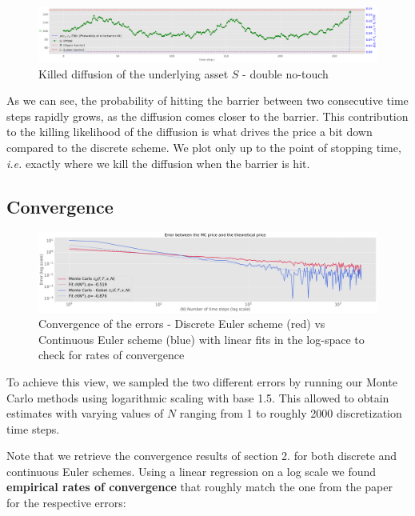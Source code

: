 \begin{figure}[H] 
    \centering
    \includegraphics[width=1\linewidth]{img/doublenotouch.png}
    \caption{Killed diffusion of the underlying asset $S$ - double no-touch}
    \label{fig:doublenotouch}
\end{figure}

As we can see, the probability of hitting the barrier between two consecutive time steps rapidly grows, as the diffusion comes closer to the barrier. This contribution to the killing likelihood of the diffusion is what drives the price a bit down compared to the discrete scheme. We plot only up to the point of stopping time, \textit{i.e.} exactly where we kill the diffusion when the barrier is hit.

\subsection{Convergence}

\begin{figure}[H]
    \centering
    \includegraphics[width=1\linewidth]{img/convergence.pdf}
    \caption{Convergence of the errors - Discrete Euler scheme (red) vs Continuous Euler scheme (blue) with linear fits in the log-space to check for rates of convergence}
    \label{fig:convergence}
\end{figure}

To achieve this view, we sampled the two different errors by running our Monte Carlo methods using logarithmic scaling with base 1.5. This allowed to obtain estimates with varying values of $N$ ranging from 1 to roughly 2000 discretization time steps.

Note that we retrieve the convergence results of section 2. for both discrete and continuous Euler schemes. Using a linear regression on a log scale we found \textbf{empirical rates of convergence} that roughly match the one from the paper for the respective errors: 


